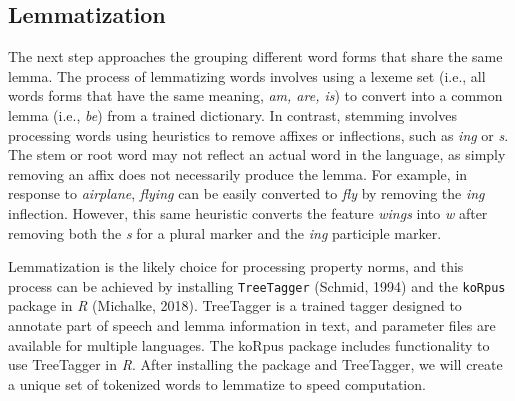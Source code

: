 \documentclass[man]{apa6}
\newenvironment{Shaded}{\begin{snugshade}}{\end{snugshade}}
\newcommand{\CommentTok}[1]{\textcolor[rgb]{0.56,0.35,0.01}{\textit{#1}}}
\newcommand{\DataTypeTok}[1]{\textcolor[rgb]{0.13,0.29,0.53}{#1}}
\newcommand{\KeywordTok}[1]{\textcolor[rgb]{0.13,0.29,0.53}{\textbf{#1}}}
\newcommand{\NormalTok}[1]{#1}
\newcommand{\OperatorTok}[1]{\textcolor[rgb]{0.81,0.36,0.00}{\textbf{#1}}}
\newcommand{\StringTok}[1]{\textcolor[rgb]{0.31,0.60,0.02}{#1}}
\begin{document}
\normalsize

\hypertarget{lemmatization}{%
\subsection{Lemmatization}\label{lemmatization}}

The next step approaches the grouping different word forms that share the same lemma. The process of lemmatizing words involves using a lexeme set (i.e., all words forms that have the same meaning, \emph{am, are, is}) to convert into a common lemma (i.e., \emph{be}) from a trained dictionary. In contrast, stemming involves processing words using heuristics to remove affixes or inflections, such as \emph{ing} or \emph{s}. The stem or root word may not reflect an actual word in the language, as simply removing an affix does not necessarily produce the lemma. For example, in response to \emph{airplane}, \emph{flying} can be easily converted to \emph{fly} by removing the \emph{ing} inflection. However, this same heuristic converts the feature \emph{wings} into \emph{w} after removing both the \emph{s} for a plural marker and the \emph{ing} participle marker.

Lemmatization is the likely choice for processing property norms, and this process can be achieved by installing \texttt{TreeTagger} (Schmid, 1994) and the \texttt{koRpus} package in \emph{R} (Michalke, 2018). TreeTagger is a trained tagger designed to annotate part of speech and lemma information in text, and parameter files are available for multiple languages. The koRpus package includes functionality to use TreeTagger in \emph{R}. After installing the package and TreeTagger, we will create a unique set of tokenized words to lemmatize to speed computation.

\scriptsize

\begin{Shaded}
\end{Shaded}
\end{document}
